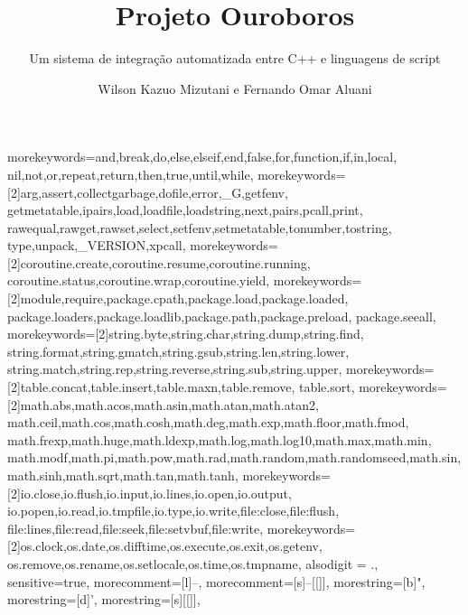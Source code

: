 \documentclass[brazil]{beamer}
\title{
  Projeto Ouroboros
}
\subtitle{
  Um sistema de integração automatizada entre C++ e
  linguagens de script
}
\author{Wilson Kazuo Mizutani e Fernando Omar Aluani}
\begin{document}
  {morekeywords={and,break,do,else,elseif,end,false,for,function,if,in,local,
     nil,not,or,repeat,return,then,true,until,while},
   morekeywords={[2]arg,assert,collectgarbage,dofile,error,_G,getfenv,
     getmetatable,ipairs,load,loadfile,loadstring,next,pairs,pcall,print,
     rawequal,rawget,rawset,select,setfenv,setmetatable,tonumber,tostring,
     type,unpack,_VERSION,xpcall},
   morekeywords={[2]coroutine.create,coroutine.resume,coroutine.running,
     coroutine.status,coroutine.wrap,coroutine.yield},
   morekeywords={[2]module,require,package.cpath,package.load,package.loaded,
     package.loaders,package.loadlib,package.path,package.preload,
     package.seeall},
   morekeywords={[2]string.byte,string.char,string.dump,string.find,
     string.format,string.gmatch,string.gsub,string.len,string.lower,
     string.match,string.rep,string.reverse,string.sub,string.upper},
   morekeywords={[2]table.concat,table.insert,table.maxn,table.remove,
   table.sort},
   morekeywords={[2]math.abs,math.acos,math.asin,math.atan,math.atan2,
     math.ceil,math.cos,math.cosh,math.deg,math.exp,math.floor,math.fmod,
     math.frexp,math.huge,math.ldexp,math.log,math.log10,math.max,math.min,
     math.modf,math.pi,math.pow,math.rad,math.random,math.randomseed,math.sin,
     math.sinh,math.sqrt,math.tan,math.tanh},
   morekeywords={[2]io.close,io.flush,io.input,io.lines,io.open,io.output,
     io.popen,io.read,io.tmpfile,io.type,io.write,file:close,file:flush,
     file:lines,file:read,file:seek,file:setvbuf,file:write},
   morekeywords={[2]os.clock,os.date,os.difftime,os.execute,os.exit,os.getenv,
     os.remove,os.rename,os.setlocale,os.time,os.tmpname},
   alsodigit = {.},
   sensitive=true,
   morecomment=[l]{--},
   morecomment=[s]{--[[}{]]},
   morestring=[b]",
   morestring=[d]',
   morestring=[s]{[[}{]]},
  }


\frame{\titlepage}

\frame{\tableofcontents}

\end{document}
